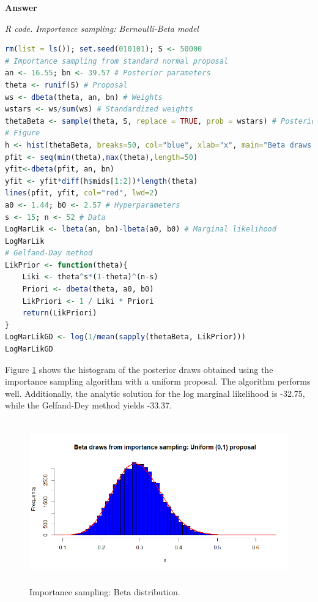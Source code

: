 \begin{enumerate}[leftmargin=*]
\textbf{Answer}

 \begin{tcolorbox}[enhanced,width=4.67in,center upper,
	fontupper=\large\bfseries,drop shadow southwest,sharp corners]
	\textit{R code. Importance sampling: Bernoulli-Beta model}
	\begin{VF}
		\begin{lstlisting}[language=R]
rm(list = ls()); set.seed(010101); S <- 50000
# Importance sampling from standard normal proposal 
an <- 16.55; bn <- 39.57 # Posterior parameters
theta <- runif(S) # Proposal
ws <- dbeta(theta, an, bn) # Weights
wstars <- ws/sum(ws) # Standardized weights
thetaBeta <- sample(theta, S, replace = TRUE, prob = wstars) # Posterior draws
# Figure
h <- hist(thetaBeta, breaks=50, col="blue", xlab="x", main="Beta draws from importance sampling: Uniform (0,1) proposal")
pfit <- seq(min(theta),max(theta),length=50)
yfit<-dbeta(pfit, an, bn)
yfit <- yfit*diff(h$mids[1:2])*length(theta)
lines(pfit, yfit, col="red", lwd=2)
a0 <- 1.44; b0 <- 2.57 # Hyperparameters
s <- 15; n <- 52 # Data
LogMarLik <- lbeta(an, bn)-lbeta(a0, b0) # Marginal likelihood
LogMarLik
# Gelfand-Day method
LikPrior <- function(theta){
	Liki <- theta^s*(1-theta)^(n-s)
	Priori <- dbeta(theta, a0, b0)
	LikPriori <- 1 / Liki * Priori 
	return(LikPriori)
}
LogMarLikGD <- log(1/mean(sapply(thetaBeta, LikPrior)))
LogMarLikGD
\end{lstlisting}
	\end{VF}
\end{tcolorbox} 

Figure \ref{fig55} shows the histogram of the posterior draws obtained using the importance sampling algorithm with a uniform proposal. The algorithm performs well. Additionally, the analytic solution for the log marginal likelihood is -32.75, while the Gelfand-Dey method yields -33.37.

\begin{figure}[!h]
	\includegraphics[width=340pt, height=200pt]{Chapters/chapter5/figures/ISbeta.png}
	\caption[List of figure caption goes here]{Importance sampling: Beta distribution.}\label{fig55}
\end{figure}  
  

\end{enumerate}